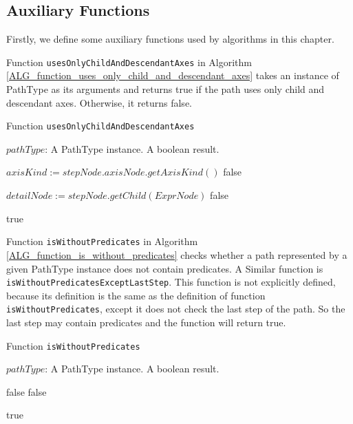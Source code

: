 \subsection{Auxiliary Functions} \label{step_4_auxiliary_functions}
Firstly, we define some auxiliary functions used by algorithms in this chapter.

Function \texttt{usesOnlyChildAndDescendantAxes} in Algorithm \ref{ALG_function_uses_only_child_and_descendant_axes} takes an instance of PathType as its arguments and returns true if the path uses only child and descendant axes. Otherwise, it returns false.

\begin{algorithm}
\caption{Function \texttt{usesOnlyChildAndDescendantAxes}}
\label{ALG_function_uses_only_child_and_descendant_axes}
\begin{algorithmic}[1]
\REQUIRE $pathType$: A PathType instance.
\ENSURE A boolean result.

		\STATE $axisKind := stepNode.axisNode.getAxisKind()$
			\RETURN false
		\ENDIF
	\ENDIF
\ENDFOR

\STATE $detailNode := stepNode.getChild(ExprNode)$
			\RETURN false
		\ENDIF
	\ENDIF
\ENDIF

\RETURN true
\end{algorithmic}
\end{algorithm}

Function \texttt{isWithoutPredicates} in Algorithm \ref{ALG_function_is_without_predicates} checks whether a path represented by a given PathType instance does not contain predicates. A Similar function is  \texttt{isWithoutPredicatesExceptLastStep}. This function is not explicitly defined, because its definition is the same as the definition of function \texttt{isWithoutPredicates}, except it does not check the last step of the path. So the last step may contain predicates and the function will return true.

\begin{algorithm}
\caption{Function \texttt{isWithoutPredicates}}
\label{ALG_function_is_without_predicates}
\begin{algorithmic}[1]
\REQUIRE $pathType$: A PathType instance.
\ENSURE A boolean result.

		\RETURN false
	\ENDIF
			\RETURN false
		\ENDIF
	\ENDIF
\ENDFOR

\RETURN true
\end{algorithmic}
\end{algorithm}


